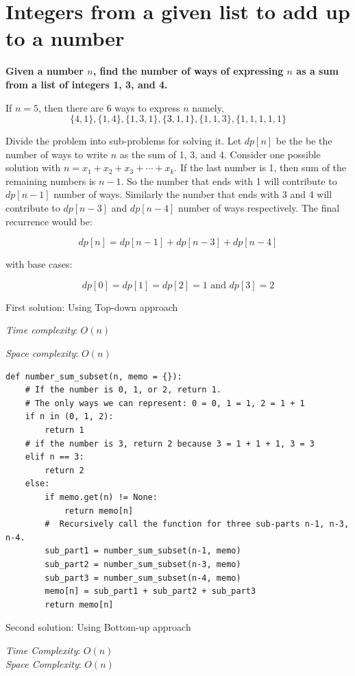 \documentclass[a4paper,11pt]{book}
\begin{document}
\section{Integers from a given list to add up to a number}

\noindent \textbf{Given a number $n$, find the number of ways of expressing $n$ as a sum from a list of integers 1, 3, and 4.}
\vspace{5mm}

\noindent If $n = 5$, then there are 6 ways to express $n$ namely, $$\{4,1\}, \{1,4\}, \{1,3,1\}, \{3,1,1\}, \{1,1,3\}, \{1,1,1,1,1\}$$

\noindent Divide the problem into sub-problems for solving it. Let $dp[n]$ be the be the number of ways to write $n$ as the sum of 1, 3, and 4. Consider one possible solution with $n = x_1 + x_2 + x_3 + \cdots + x_k$. If the last number is 1, then sum of the remaining numbers is $n-1$. So the number that ends with 1 will contribute to $dp[n-1]$ number of ways. Similarly the number that ends with 3 and 4 will contribute to $dp[n-3]$ and $dp[n-4]$ number of ways respectively. The final recurrence would be: 

$$dp[n] = dp[n-1] + dp[n-3] + dp[n-4]$$

\noindent with base cases:

$$dp[0] = dp[1] = dp[2] = 1 \text{ and } dp[3] = 2$$

\noindent First solution: Using Top-down approach

\noindent \textit{Time complexity}:  $O(n)$

\noindent \textit{Space complexity}: $O(n)$
\begin{lstlisting}
def number_sum_subset(n, memo = {}):
    # If the number is 0, 1, or 2, return 1.
    # The only ways we can represent: 0 = 0, 1 = 1, 2 = 1 + 1
    if n in (0, 1, 2):
        return 1
    # if the number is 3, return 2 because 3 = 1 + 1 + 1, 3 = 3
    elif n == 3:
        return 2
    else:
        if memo.get(n) != None:
            return memo[n]
        #  Recursively call the function for three sub-parts n-1, n-3, n-4.
        sub_part1 = number_sum_subset(n-1, memo)
        sub_part2 = number_sum_subset(n-3, memo)
        sub_part3 = number_sum_subset(n-4, memo)
        memo[n] = sub_part1 + sub_part2 + sub_part3
        return memo[n]
\end{lstlisting}

\noindent Second solution: Using Bottom-up approach

\noindent \textit{Time Complexity}: $O(n)$\\
\noindent \textit{Space Complexity}: $O(n)$
\end{document}
